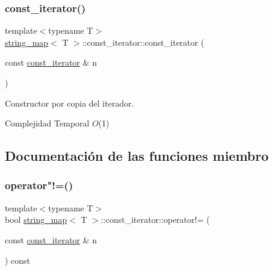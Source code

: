 \subsubsection{\texorpdfstring{const\+\_\+iterator()}{const\_iterator()}\hspace{0.1cm}{\footnotesize\ttfamily [2/2]}}
{\footnotesize\ttfamily template$<$typename T$>$ \\
\mbox{\hyperlink{classstring__map}{string\+\_\+map}}$<$ T $>$\+::const\+\_\+iterator\+::const\+\_\+iterator (\begin{DoxyParamCaption}\item[{const \mbox{\hyperlink{classstring__map_1_1const__iterator}{const\+\_\+iterator}} \&}]{n }\end{DoxyParamCaption})\hspace{0.3cm}{\ttfamily [inline]}}



Constructor por copia del iterador. 


\begin{DoxyDescription}
\item[Complejidad Temporal]$O$(1)
\end{DoxyDescription}

\subsection{Documentación de las funciones miembro}
\mbox{\label{classstring__map_1_1const__iterator_a37795e1ca2aea1271315d4c244fff188}} 
\subsubsection{\texorpdfstring{operator"!=()}{operator!=()}}
{\footnotesize\ttfamily template$<$typename T$>$ \\
bool \mbox{\hyperlink{classstring__map}{string\+\_\+map}}$<$ T $>$\+::const\+\_\+iterator\+::operator!= (\begin{DoxyParamCaption}\item[{const \mbox{\hyperlink{classstring__map_1_1const__iterator}{const\+\_\+iterator}} \&}]{n }\end{DoxyParamCaption}) const\hspace{0.3cm}{\ttfamily [inline]}}



